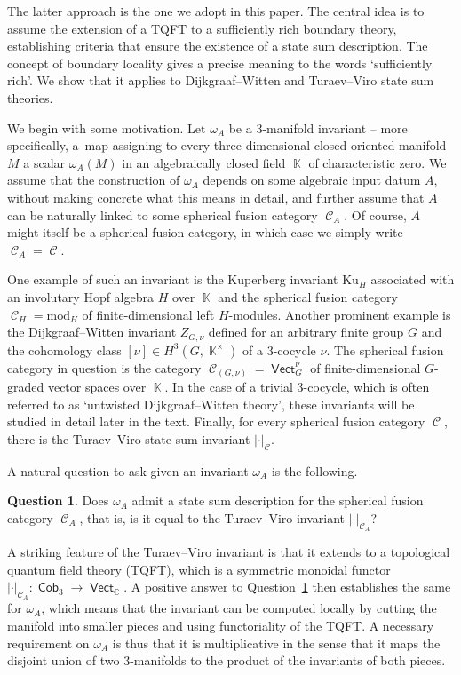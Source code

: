 \documentclass[pdftex]{sigma}
\DeclareMathOperator{\vect}{\mathsf{Vect}}
\DeclareMathOperator{\K}{\mathbb{K}}
\DeclareMathOperator{\C}{\mathbb{C}}
\DeclareMathOperator{\Cob}{\mathsf{Cob}}
\DeclareMathOperator{\calc}{\mathcal{C}}
\numberwithin{equation}{section}
\theoremstyle{definition}
\newtheorem{Question}[Mainthm]{Question}
\begin{document}
The latter approach is the one we adopt in this paper. The central idea is to assume the extension of a TQFT
to a sufficiently rich boundary theory, establishing criteria that ensure the existence of a state sum description. The concept of boundary locality gives a precise meaning to
the words `sufficiently rich'. We show that it applies to Dijkgraaf--Witten
and Turaev--Viro state sum theories.

We begin with some motivation. Let $\omega_A$ be a 3-manifold invariant -- more specifically, a~map assigning to every three-dimensional closed oriented manifold $M$ a scalar $\omega_A(M)$ in an algebraically closed field $\K$ of characteristic zero. We assume that the construction of $\omega_A$ depends on some algebraic input datum $A$, without making concrete what this means in detail, and further assume that $A$ can be naturally linked to some spherical fusion category $\calc_A$. Of course, $A$ might itself be a spherical fusion category, in which case we simply write $\calc_A = \calc$.

One example of such an invariant is the Kuperberg invariant $\mathrm{Ku}_H$ associated with an involutary Hopf algebra $H$ over $\K$ and the spherical fusion category $\calc_H = \mathrm{mod}_H$ of finite-dimensional left $H$-modules. Another prominent example is the Dijkgraaf--Witten invariant $Z_{G, \nu}$ defined for an arbitrary finite group $G$ and the cohomology class $[\nu] \in H^3(G, \K^\times)$ of a 3-cocycle $\nu$. The spherical fusion category in question is the category $\calc_{(G, \nu)} = \vect_G^{\nu}$ of finite-dimensional $G$-graded vector spaces over $\K$. In the case of a trivial 3-cocycle, which is often referred to as `untwisted Dijkgraaf--Witten theory', these invariants will be studied in detail later in the text. Finally, for every spherical fusion category $\calc$, there is the Turaev--Viro state sum invariant $|\cdot|_{\calc}$.

A natural question to ask given an invariant $\omega_A$ is the following.
\begin{Question}
 \label{quest}
 Does $\omega_A$ admit a state sum description for the spherical fusion category $\calc_A$, that is, is it equal to the Turaev--Viro invariant $|\cdot|_{\calc_A}$?
\end{Question}
A striking feature of the Turaev--Viro invariant is that it extends to a topological quantum field theory (TQFT), which is a symmetric monoidal functor $|\cdot|_{\calc_A}\colon \Cob_3 \rightarrow \vect_{\C}$. A positive answer to Question~\ref{quest} then establishes the same for $\omega_A$, which means that the invariant can be computed locally by cutting the manifold into smaller pieces and using functoriality of the TQFT. A necessary requirement on $\omega_A$ is thus that it is multiplicative in the sense that it maps the disjoint union of two 3-manifolds to the product of the invariants of both pieces.
\end{document}
